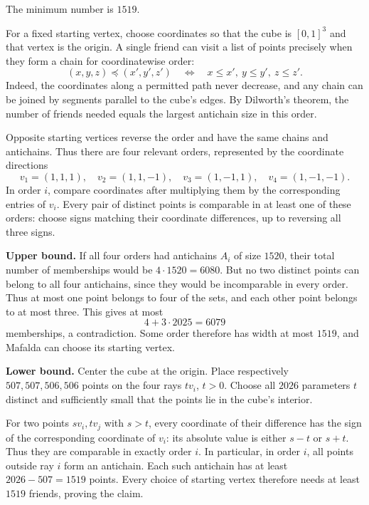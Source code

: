 \documentclass[12pt]{memoir}
\begin{document}
\begin{Ej}
The minimum number is \(\boxed{1519}\).

For a fixed starting vertex, choose coordinates so that the cube is
\([0,1]^3\) and that vertex is the origin. A single friend can visit a
list of points precisely when they form a chain for coordinatewise order:
\[
    (x,y,z)\preceq(x',y',z')
    \quad\Longleftrightarrow\quad x\leq x',\ y\leq y',\ z\leq z'.
\]
Indeed, the coordinates along a permitted path never decrease, and any
chain can be joined by segments parallel to the cube's edges. By
Dilworth's theorem, the number of friends needed equals the largest
antichain size in this order.

Opposite starting vertices reverse the order and have the same chains
and antichains. Thus there are four relevant orders, represented by
the coordinate directions
\[
    v_1=(1,1,1),\quad v_2=(1,1,-1),\quad
    v_3=(1,-1,1),\quad v_4=(1,-1,-1).
\]
In order \(i\), compare coordinates after multiplying them by the
corresponding entries of \(v_i\). Every pair of distinct points is
comparable in at least one of these orders: choose signs matching their
coordinate differences, up to reversing all three signs.

\textbf{Upper bound.}
If all four orders had antichains \(A_i\) of size \(1520\), their
total number of memberships would be \(4\cdot1520=6080\).
But no two distinct points can belong to all four antichains, since
they would be incomparable in every order. Thus at most one point
belongs to four of the sets, and each other point belongs to at most
three. This gives at most
\[
    4+3\cdot2025=6079
\]
memberships, a contradiction. Some order therefore has width at most
\(1519\), and Mafalda can choose its starting vertex.

\textbf{Lower bound.}
Center the cube at the origin. Place respectively
\(507,507,506,506\) points on the four rays \(t v_i\), \(t>0\).
Choose all \(2026\) parameters \(t\) distinct and sufficiently small
that the points lie in the cube's interior.

For two points \(s v_i,t v_j\) with \(s>t\), every coordinate of
their difference has the sign of the corresponding coordinate of
\(v_i\): its absolute value is either \(s-t\) or \(s+t\).
Thus they are comparable in exactly order \(i\). In particular, in
order \(i\), all points outside ray \(i\) form an antichain.
Each such antichain has at least \(2026-507=1519\) points.
Every choice of starting vertex therefore needs at least \(1519\)
friends, proving the claim.
\end{Ej}
\end{document}

